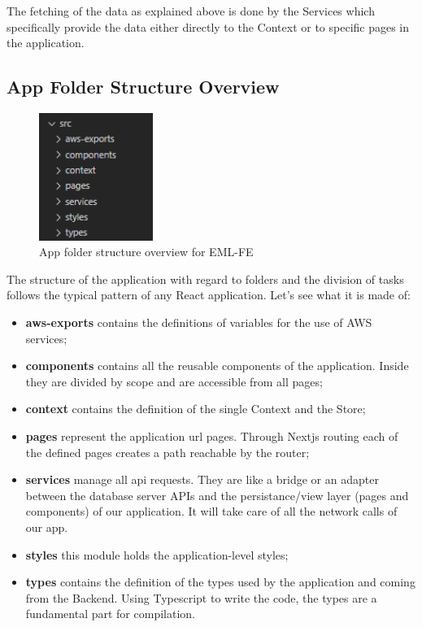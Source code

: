 The fetching of the data as explained above is done by the Services which specifically provide the data either directly to the Context or to specific pages in the application.

\subsection{App Folder Structure Overview} \label{_folder}

\begin{figure}[H]
    \centering
    \includegraphics[width=10em]{res/images/frontend-diagrams/app-folder-structure.png}
    \caption{App folder structure overview for EML-FE}
\end{figure}

The structure of the application with regard to folders and the division of tasks follows the typical pattern of any React application. Let's see what it is made of:

\begin{itemize}
    \item \textbf{aws-exports} contains the definitions of variables for the use of AWS services;
    \item \textbf{components} contains all the reusable components of the application. Inside they are divided by scope and are accessible from all pages;
    \item \textbf{context} contains the definition of the single Context and the Store;
    \item \textbf{pages} represent the application url pages. Through Nextjs routing each of the defined pages creates a path reachable by the router;
    \item \textbf{services} manage all api requests. They are like a bridge or an adapter between the database server APIs and the persistance/view layer (pages and components) of our application. It will take care of all the network calls of our app.
    \item \textbf{styles} this module holds the application-level styles;
    \item \textbf{types} contains the definition of the types used by the application and coming from the Backend. Using Typescript to write the code, the types are a fundamental part for compilation.
\end{itemize}